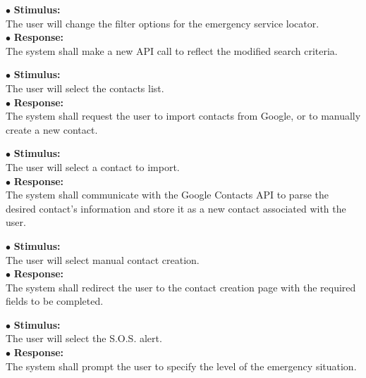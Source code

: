 \documentclass{scrreprt}
\begin{document}
\vspace{5mm}
	\hspace{-4.75mm} $\bullet$ \textbf{Stimulus:} \\ \hspace{5mm} The user will change the filter options for the emergency service locator.\\
	$\bullet$ \textbf{Response:} \\ \hspace{5mm} The system shall make a new API call to reflect the modified search criteria.

\vspace{5mm}
	\hspace{-4.75mm} $\bullet$ \textbf{Stimulus:} \\ \hspace{5mm} The user will select the contacts list.\\
	$\bullet$ \textbf{Response:} \\ \hspace{5mm} The system shall request the user to import contacts from Google, or to manually create a new contact.
\newpage

\vspace{5mm}
	\hspace{-4.75mm} $\bullet$ \textbf{Stimulus:} \\ \hspace{5mm} The user will select a contact to import.\\
	$\bullet$ \textbf{Response:} \\ \hspace{5mm} The system shall communicate with the Google Contacts API to parse the desired contact's information and store it as a new contact associated with the user.

\vspace{5mm}
	\hspace{-4.75mm} $\bullet$ \textbf{Stimulus:} \\ \hspace{5mm} The user will select manual contact creation.\\
	$\bullet$ \textbf{Response:} \\ \hspace{5mm} The system shall redirect the user to the contact creation page with the required fields to be completed.

\vspace{5mm}
	\hspace{-4.75mm} $\bullet$ \textbf{Stimulus:} \\ \hspace{5mm} The user will select the S.O.S. alert.\\
	$\bullet$ \textbf{Response:} \\ \hspace{5mm} The system shall prompt the user to specify the level of the emergency situation.
\end{document}
